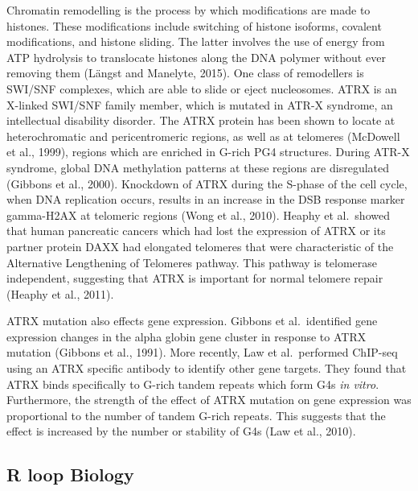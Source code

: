 \documentclass[12pt,a4paper,]{report}
\begin{document}
Chromatin remodelling is the process by which modifications are made to
histones. These modifications include switching of histone isoforms,
covalent modifications, and histone sliding. The latter involves the use
of energy from ATP hydrolysis to translocate histones along the DNA
polymer without ever removing them (Längst and Manelyte, 2015). One
class of remodellers is SWI/SNF complexes, which are able to slide or
eject nucleosomes. ATRX is an X-linked SWI/SNF family member, which is
mutated in ATR-X syndrome, an intellectual disability disorder. The ATRX
protein has been shown to locate at heterochromatic and pericentromeric
regions, as well as at telomeres (McDowell et al., 1999), regions which
are enriched in G-rich PG4 structures. During ATR-X syndrome, global DNA
methylation patterns at these regions are disregulated (Gibbons et al.,
2000). Knockdown of ATRX during the S-phase of the cell cycle, when DNA
replication occurs, results in an increase in the DSB response marker
gamma-H2AX at telomeric regions (Wong et al., 2010). Heaphy et
al.~showed that human pancreatic cancers which had lost the expression
of ATRX or its partner protein DAXX had elongated telomeres that were
characteristic of the Alternative Lengthening of Telomeres pathway. This
pathway is telomerase independent, suggesting that ATRX is important for
normal telomere repair (Heaphy et al., 2011).

ATRX mutation also effects gene expression. Gibbons et al.~identified
gene expression changes in the alpha globin gene cluster in response to
ATRX mutation (Gibbons et al., 1991). More recently, Law et
al.~performed ChIP-seq using an ATRX specific antibody to identify other
gene targets. They found that ATRX binds specifically to G-rich tandem
repeats which form G4s \emph{in vitro}. Furthermore, the strength of the
effect of ATRX mutation on gene expression was proportional to the
number of tandem G-rich repeats. This suggests that the effect is
increased by the number or stability of G4s (Law et al., 2010).

\newpage

\hypertarget{r-loop-biology}{%
\subsection{R loop Biology}\label{r-loop-biology}}

\label{ssec:rloop_csr}
\end{document}
